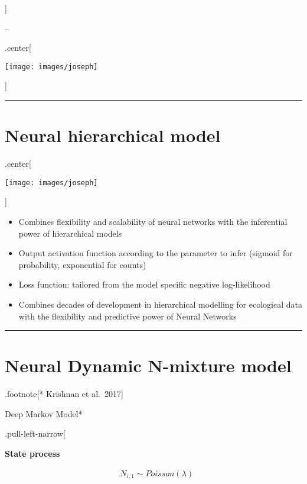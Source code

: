 \documentclass[
]{article}
\begin{document}
{]}

--

.center{[}

\texttt{[image: images/joseph]}

{]}

\begin{center}\rule{0.5\linewidth}{0.5pt}\end{center}

\section{Neural hierarchical model}\label{neural-hierarchical-model-1}

.center{[}

\texttt{[image: images/joseph]}

{]}

\begin{itemize}
\item
  Combines flexibility and scalability of neural networks with the
  inferential power of hierarchical models
\item
  Output activation function according to the parameter to infer
  (sigmoid for probability, exponential for counts)
\item
  Loss function: tailored from the model specific negative
  log-likelihood
\item
  Combines decades of development in hierarchical modelling for
  ecological data with the flexibility and predictive power of Neural
  Networks
\end{itemize}

\begin{center}\rule{0.5\linewidth}{0.5pt}\end{center}

\section{Neural Dynamic N-mixture
model}\label{neural-dynamic-n-mixture-model}

.footnote{[}* Krishnan et al.~2017{]}

Deep Markov Model*

.pull-left-narrow{[}

\textbf{State process}

\[\begin{align*}
& N_{i,1} \sim Poisson(\lambda)
\end{align*}\]
\end{document}
